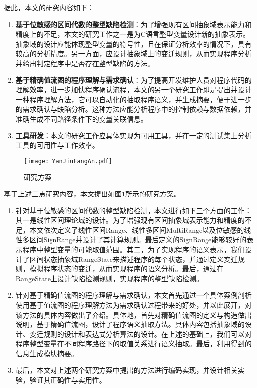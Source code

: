 据此，本文的研究内容如下：  
 \begin{enumerate}
	\item \textbf{基于位敏感的区间代数的整型缺陷检测}：为了增强现有区间抽象域表示能力和精度上的不足，本文的研究工作之一是为C语言整型变量设计新的抽象表示。抽象域的设计应能体现整型变量的符号性，且在保证分析效率的情况下，具有较高的分析精度。另一方面，应设计抽象域上的变迁规则，从而实现程序分析并给出判定程序中是否存在整型缺陷的方法。
	
	\item \textbf{基于精确值流图的程序理解与需求确认}：为了提高开发维护人员对程序代码的理解效率，进一步加快程序确认流程，本文的另一个研究工作即是提出并设计一种程序理解方法，它可以自动化的抽取程序语义，并生成摘要，便于进一步的需求确认与缺陷分析。这种方法应能分析程序中的控制依赖与数据依赖，并准确生成不同路径条件下的变量关联信息。
	
	\item \textbf{工具研发}：本文的研究工作应具体实现为可用工具，并在一定的测试集上分析工具的可用性与工作效率。 	
 \end{enumerate}

\begin{figure}[H]
	\centering
	\texttt{[image: YanJiuFangAn.pdf]}
	\caption{研究方案}
	\label{fig:研究方案}
\end{figure}

  基于上述三点研究内容，本文提出如图\ref{fig:研究方案}所示的研究方案。
  
  \begin{enumerate}
  	\item 针对基于位敏感的区间代数的整型缺陷检测，本文进行如下三个方面的工作：其一是线性区间理论域的设计。为了增强现有区间抽象域表示能力和精度的不足，本文依次定义了线性区间Range、线性多区间MultiRange以及位敏感的线性多区间SignRange并设计了其计算规则。最后定义的SignRange能够较好的表示程序中整型变量的可能取值范围。其二，为了实现程序的语义表示，我们设计了区间状态抽象域RangeState来描述程序的每个状态，并通过定义变迁规则，模拟程序状态的变迁，从而实现程序的语义分析。最后，通过在RangeState上设计缺陷检测规则，实现程序的整型缺陷检测。
  	
  	\item 针对基于精确值流图的程序理解与需求确认，本文首先通过一个具体案例剖析使用基于值流图的程序理解方法为需求确认过程带来的好处，并以此展开，对该方法的具体内容做出了介绍。具体地，首先对精确值流图的定义与构造做出说明，基于精确值流图，设计了程序语义抽取方法。具体内容包括抽象域的设计、变迁规则的设计和表达式分析算法的设计。在上述的基础上，我们可以对程序整型变量在不同程序路径下的取值关系进行语义抽取。最后，利用得到的信息生成模块摘要。
  	
  	\item 最后，本文对上述两个研究方案中提出的方法进行编码实现，并设计相关实验，验证其正确性与实用性。
  \end{enumerate}
  
